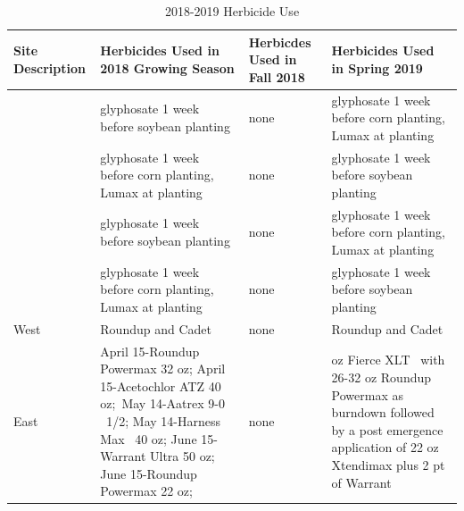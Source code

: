 \documentclass[]{article}
\begin{document}
\newpage

\begin{table}[H]

\caption{\label{tab:unnamed-chunk-2}2018-2019 Herbicide Use}
\centering
\begin{tabular}[t]{>{\centering\arraybackslash}p{8em}>{\centering\arraybackslash}p{8em}>{\centering\arraybackslash}p{8em}>{\centering\arraybackslash}p{8em}}
\toprule
Site Description & Herbicides Used in 2018 Growing Season & Herbicdes Used in Fall 2018 & Herbicides Used in Spring 2019\\
\midrule
\rowcolor{gray!6}   & glyphosate 1 week before soybean planting & none & glyphosate 1 week before corn planting, Lumax at planting\\

\multirow{-2}{8em}{\centering\arraybackslash Central Grain} & glyphosate 1 week before corn planting, Lumax at planting & none & glyphosate 1 week before soybean planting\\
\cmidrule{1-4}
\rowcolor{gray!6}   & glyphosate 1 week before soybean planting & none & glyphosate 1 week before corn planting, Lumax at planting\\

\multirow{-2}{8em}{\centering\arraybackslash Central Silage} & glyphosate 1 week before corn planting, Lumax at planting & none & glyphosate 1 week before soybean planting\\
\cmidrule{1-4}
\rowcolor{gray!6}  West & Roundup and Cadet & none & Roundup and Cadet\\
\cmidrule{1-4}
East & April 15-Roundup Powermax 32 oz; April 15-Acetochlor ATZ 40 oz; May 14-Aatrex 9-0   1/2; May 14-Harness Max  40 oz; June 15-Warrant Ultra 50 oz; June 15-Roundup Powermax 22 oz; & none & 3 oz Fierce XLT  with 26-32 oz Roundup Powermax as burndown followed by a post emergence application of 22 oz Xtendimax plus 2 pt of Warrant\\
\bottomrule
\end{tabular}
\end{table}

\newpage
\end{document}
